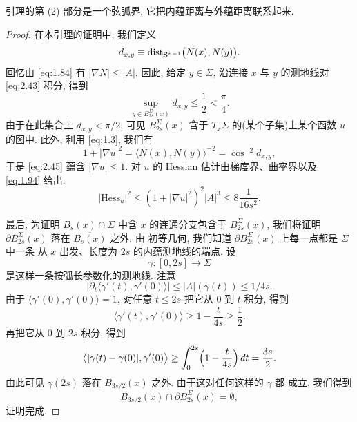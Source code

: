引理的第 (2) 部分是一个弦弧界, 它把内蕴距离与外蕴距离联系起来.

\begin{proof}
在本引理的证明中, 我们定义
\begin{equation}
d_{x,y}\equiv\operatorname{dist}_{\mathbf{S}^{n-1}}\bigl(N(x),N(y)\bigr).
\label{eq:2.44}
\end{equation}
回忆由 \eqref{eq:1.84} 有 $|\nabla N|\leq|A|$. 因此, 给定 $y\in\Sigma$, 沿连接 $x$ 与
$y$ 的测地线对 \eqref{eq:2.43} 积分, 得到
\begin{equation}
\sup_{y\in B_{2s}^{\Sigma}(x)}d_{x,y}\leq\frac12<\frac{\pi}{4}.
\label{eq:2.45}
\end{equation}
由于在此集合上 $d_{x,y}<\pi/2$, 可见 $B_{2s}^{\Sigma}(x)$ 含于 $T_x\Sigma$
的(某个子集)上某个函数 $u$ 的图中. 此外, 利用 \eqref{eq:1.3}, 我们有
\begin{equation}
1+|\nabla u|^{2}=\langle N(x),N(y)\rangle^{-2}=\cos^{-2}d_{x,y},
\label{eq:2.46}
\end{equation}
于是 \eqref{eq:2.45} 蕴含 $|\nabla u|\leq1$. 对 $u$ 的 Hessian 估计由梯度界、曲率界以及
\eqref{eq:1.94} 给出:
\begin{equation}
|\mathrm{Hess}_u|^{2}\leq(1+|\nabla u|^{2})^{2}|A|^{3}
 \leq8\frac{1}{16s^{2}}.
\label{eq:2.47}
\end{equation}

最后, 为证明 $B_s(x)\cap\Sigma$ 中含 $x$ 的连通分支包含于 $B_{2s}^{\Sigma}(x)$,
我们将证明 $\partial B_{2s}^{\Sigma}(x)$ 落在 $\overline{B_s(x)}$ 之外. 由
初等几何, 我们知道 $\partial B_{2s}^{\Sigma}(x)$ 上每一点都是 $\Sigma$ 中一条
从 $x$ 出发、长度为 $2s$ 的内蕴测地线的端点. 设
\[
\gamma:[0,2s]\to\Sigma
\]
是这样一条按弧长参数化的测地线. 注意
\begin{equation}
\bigl|\partial_t\langle\gamma'(t),\gamma'(0)\rangle\bigr|
 \leq|A|(\gamma(t))\leq1/4s.
\label{eq:2.48}
\end{equation}
由于 $\langle\gamma'(0),\gamma'(0)\rangle=1$, 对任意 $t\leq2s$ 把它从 $0$ 到
$t$ 积分, 得到
\begin{equation}
\langle\gamma'(t),\gamma'(0)\rangle\geq1-\frac{t}{4s}\geq\frac12.
\label{eq:2.49}
\end{equation}
再把它从 $0$ 到 $2s$ 积分, 得到
\begin{equation}
\bigl\langle[\gamma(t)-\gamma(0)],\gamma'(0)\bigr\rangle
 \geq\int_0^{2s}\Bigl(1-\frac{t}{4s}\Bigr)\,dt=\frac{3s}{2}.
\label{eq:2.50}
\end{equation}
由此可见 $\gamma(2s)$ 落在 $B_{3s/2}(x)$ 之外. 由于这对任何这样的 $\gamma$ 都
成立, 我们得到
\begin{equation}
B_{3s/2}(x)\cap\partial B_{2s}^{\Sigma}(x)=\emptyset,
\label{eq:2.51}
\end{equation}
证明完成.
\end{proof}


